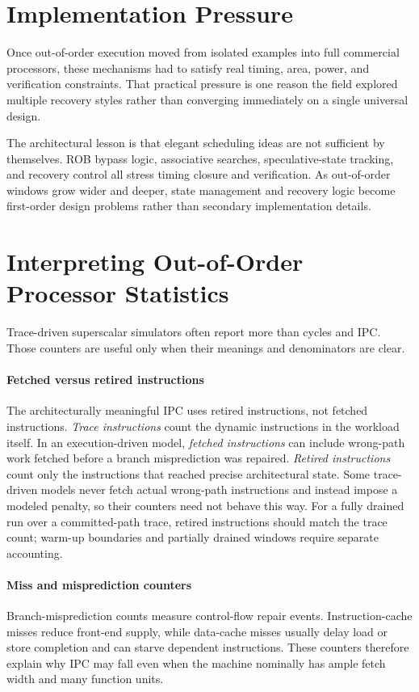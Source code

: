 \section{Implementation Pressure}\label{sec:ilp-implementation-pressure}
Once out-of-order execution moved from isolated examples into full commercial processors, these mechanisms had to satisfy real timing, area, power, and verification constraints.
That practical pressure is one reason the field explored multiple recovery styles rather than converging immediately on a single universal design.

The architectural lesson is that elegant scheduling ideas are not sufficient by themselves.
ROB bypass logic, associative searches, speculative-state tracking, and recovery control all stress timing closure and verification.
As out-of-order windows grow wider and deeper, state management and recovery logic become first-order design problems rather than secondary implementation details.


\section{Interpreting Out-of-Order Processor Statistics}\label{sec:ilp-sim-stats}
Trace-driven superscalar simulators often report more than cycles and IPC\@.
Those counters are useful only when their meanings and denominators are clear.

\paragraph{Fetched versus retired instructions}\label{par:ilp-fetched-vs-retired}
The architecturally meaningful IPC uses retired instructions, not fetched instructions.
\textit{Trace instructions} count the dynamic instructions in the workload itself.
In an execution-driven model, \textit{fetched instructions} can include wrong-path work fetched before a branch misprediction was repaired.
\textit{Retired instructions} count only the instructions that reached precise architectural state.
Some trace-driven models never fetch actual wrong-path instructions and instead impose a modeled penalty, so their counters need not behave this way.
For a fully drained run over a committed-path trace, retired instructions should match the trace count; warm-up boundaries and partially drained windows require separate accounting.

\paragraph{Miss and misprediction counters}\label{par:ilp-miss-mispredict-counters}
Branch-misprediction counts measure control-flow repair events.
Instruction-cache misses reduce front-end supply, while data-cache misses usually delay load or store completion and can starve dependent instructions.
These counters therefore explain why IPC may fall even when the machine nominally has ample fetch width and many function units.

